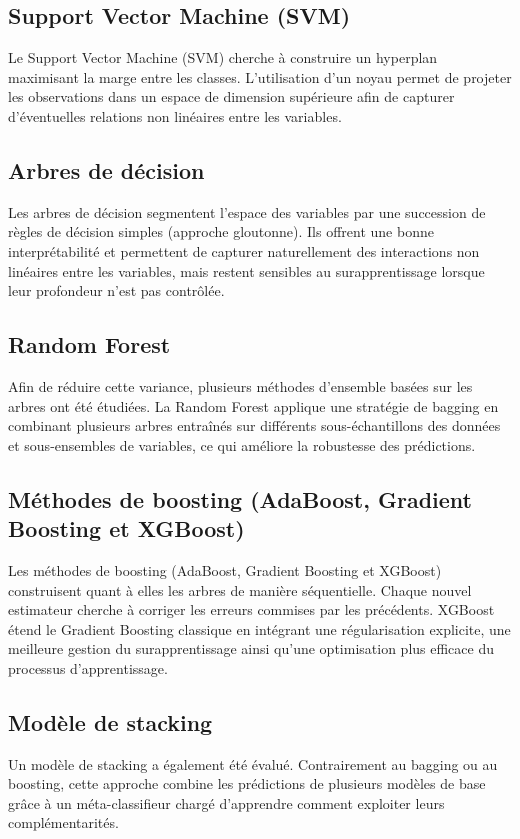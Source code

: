 \documentclass{article}
\begin{document}
\subsection{Support Vector Machine (SVM)}
Le Support Vector Machine (SVM) cherche à construire un hyperplan maximisant la marge entre les classes. L'utilisation d'un noyau permet de projeter les observations dans un espace de dimension supérieure afin de capturer d'éventuelles relations non linéaires entre les variables.

\subsection{Arbres de décision}
Les arbres de décision segmentent l'espace des variables par une succession de règles de décision simples (approche gloutonne). Ils offrent une bonne interprétabilité et permettent de capturer naturellement des interactions non linéaires entre les variables, mais restent sensibles au surapprentissage lorsque leur profondeur n'est pas contrôlée.

\subsection{Random Forest}
Afin de réduire cette variance, plusieurs méthodes d'ensemble basées sur les arbres ont été étudiées. La Random Forest applique une stratégie de bagging en combinant plusieurs arbres entraînés sur différents sous-échantillons des données et sous-ensembles de variables, ce qui améliore la robustesse des prédictions.

\subsection{Méthodes de boosting (AdaBoost, Gradient Boosting et XGBoost)}
Les méthodes de boosting (AdaBoost, Gradient Boosting et XGBoost) construisent quant à elles les arbres de manière séquentielle. Chaque nouvel estimateur cherche à corriger les erreurs commises par les précédents. XGBoost étend le Gradient Boosting classique en intégrant une régularisation explicite, une meilleure gestion du surapprentissage ainsi qu'une optimisation plus efficace du processus d'apprentissage.

\subsection{Modèle de stacking}
Un modèle de stacking a également été évalué. Contrairement au bagging ou au boosting, cette approche combine les prédictions de plusieurs modèles de base grâce à un méta-classifieur chargé d'apprendre comment exploiter leurs complémentarités.
\end{document}
